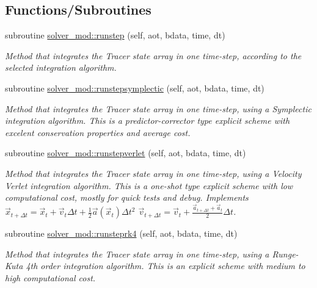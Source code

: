 \subsection*{Functions/\+Subroutines}
\begin{DoxyCompactItemize}
\item 
subroutine \mbox{\hyperlink{namespacesolver__mod_ab87d71c6c8aa1709901ec14f9bf12505}{solver\+\_\+mod\+::runstep}} (self, aot, bdata, time, dt)
\begin{DoxyCompactList}\small\item\em Method that integrates the Tracer state array in one time-\/step, according to the selected integration algorithm. \end{DoxyCompactList}\item 
subroutine \mbox{\hyperlink{namespacesolver__mod_a91ddfd70d0f6d65b00fe6b08f4113cd6}{solver\+\_\+mod\+::runstepsymplectic}} (self, aot, bdata, time, dt)
\begin{DoxyCompactList}\small\item\em Method that integrates the Tracer state array in one time-\/step, using a Symplectic integration algorithm. This is a predictor-\/corrector type explicit scheme with excelent conservation properties and average cost. \end{DoxyCompactList}\item 
subroutine \mbox{\hyperlink{namespacesolver__mod_acf893016edd8e0eb4bc77666aed1096f}{solver\+\_\+mod\+::runstepverlet}} (self, aot, bdata, time, dt)
\begin{DoxyCompactList}\small\item\em Method that integrates the Tracer state array in one time-\/step, using a Velocity Verlet integration algorithm. This is a one-\/shot type explicit scheme with low computational cost, mostly for quick tests and debug. Implements $ {\vec {x}}_{t+\Delta t}={\vec {x}}_{t}+{\vec {v}}_{t}\Delta t+{\frac {1}{2}}{\vec {a}}({\vec {x}}_{t})\Delta t^{2}$ $ {\vec {v}}_{t+\Delta t}={\vec {v}}_{t}+\frac{{\vec {a}}_{t+\Delta t}+{\vec {a}}_{t}}{2}\Delta t$. \end{DoxyCompactList}\item 
subroutine \mbox{\hyperlink{namespacesolver__mod_ae59da54f053ae369d76f130b3790f3b7}{solver\+\_\+mod\+::runsteprk4}} (self, aot, bdata, time, dt)
\begin{DoxyCompactList}\small\item\em Method that integrates the Tracer state array in one time-\/step, using a Runge-\/\+Kuta 4th order integration algorithm. This is an explicit scheme with medium to high computational cost. \end{DoxyCompactList}\item 

\end{DoxyCompactItemize}
